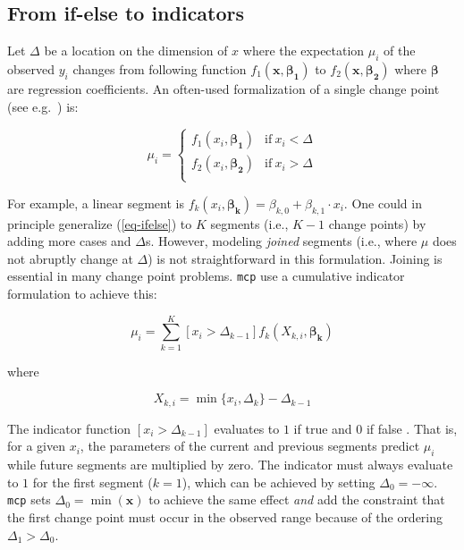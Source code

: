 \documentclass[
  american,
]{article}
\begin{document}
\hypertarget{from-if-else-to-indicators}{%
\subsection{From if-else to indicators}\label{from-if-else-to-indicators}}

Let \(\Delta\) be a location on the dimension of \(x\) where the expectation \(\mu_i\) of the observed \(y_i\) changes from following function \(f_1(\mathbf{x}, \mathbf{\beta_1})\) to \(f_2(\mathbf{x}, \mathbf{\beta_2})\) where \(\mathbf{\beta}\) are regression coefficients. An often-used formalization of a single change point (see e.g.~\citep{stephens1994, carlin1992}) is:

\begin{equation}
\label{eq-ifelse}
\mu_i = \begin{cases}
      f_1(x_i , \mathbf{\beta_1}) & \text{if}\ x_i < \Delta \\
      f_2(x_i , \mathbf{\beta_2}) & \text{if}\ x_i > \Delta \\
    \end{cases}
\end{equation}

For example, a linear segment is \(f_k(x_i , \mathbf{\beta_k}) = \beta_{k, 0} + \beta_{k, 1} \cdot x_i\). One could in principle generalize (\ref{eq-ifelse}) to \(K\) segments (i.e., \(K-1\) change points) by adding more cases and \(\Delta\)s. However, modeling \emph{joined} segments (i.e., where \(\mu\) does not abruptly change at \(\Delta\)) is not straightforward in this formulation. Joining is essential in many change point problems. \texttt{mcp} use a cumulative indicator formulation to achieve this:

\begin{equation}
\label{eq-indicator}
\mu_i = \sum_{k=1}^{K} [x_i > \Delta_{k-1}]  f_k(X_{k, i} , \mathbf{\beta_k})
\end{equation}

where

\begin{equation}
\label{eq-localx}
X_{k,i} = \min\{x_i, \Delta_k\} - \Delta_{k-1}
\end{equation}

The indicator function \([x_i > \Delta_{k-1}]\) evaluates to \(1\) if true and \(0\) if false \citep{knuth1992}. That is, for a given \(x_i\), the parameters of the current and previous segments predict \(\mu_i\) while future segments are multiplied by zero. The indicator must always evaluate to \(1\) for the first segment (\(k = 1\)), which can be achieved by setting \(\Delta_0 = -\infty\). \texttt{mcp} sets \(\Delta_0 = \min(\mathbf{x})\) to achieve the same effect \emph{and} add the constraint that the first change point must occur in the observed range because of the ordering \(\Delta_1 > \Delta_0\).
\end{document}
